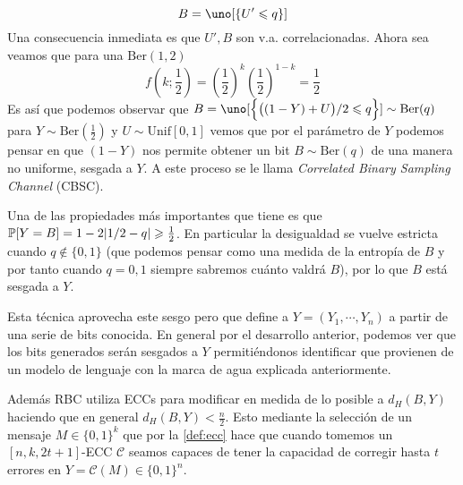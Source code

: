 \documentclass[a4paper,11pt]{article}
\begin{document}
\[B=\uno[\{U'\leqslant q\}]\]
Una consecuencia inmediata es que $U',B$ son v.a. correlacionadas. Ahora sea veamos que para una $\textrm{Ber}(1,2)$
\[f(k;\frac{1}{2})=\left(\frac{1}{2}\right)^k\left(\frac{1}{2}\right)^{1-k}=\frac{1}{2}\]
Es así que podemos observar que $B=\uno[\Big\{\big((1-Y)+U\big)/2\leqslant q\Big\}]\sim \textrm{Ber}(q)$ para $Y\sim\textrm{Ber}\left(\frac{1}{2}\right)$ y $U\sim\textrm{Unif}[0,1]$ vemos que por el parámetro de $Y$ podemos pensar en que $(1-Y)$ nos permite obtener un bit $B\sim\textrm{Ber}(q)$ de una manera no uniforme, sesgada a $Y$. A este proceso se le llama \textit{Correlated Binary Sampling Channel} (CBSC).
\par Una de las propiedades más importantes que tiene es que $\mathbb{P}[Y=B]=1-2|1/2-q|\geqslant\frac{1}{2}$. En particular la desigualdad se vuelve estricta cuando $q\not\in\{0,1\}$ (que podemos pensar como una medida de la entropía de $B$ y por tanto cuando $q=0,1$ siempre sabremos cuánto valdrá $B$), por lo que $B$ está sesgada a $Y$. 
\par Esta técnica aprovecha este sesgo pero que define a $Y=(Y_1,\cdots,Y_n)$ a partir de una serie de bits conocida. En general por el desarrollo anterior, podemos ver que los bits generados serán sesgados a $Y$ permitiéndonos identificar que provienen de un modelo de lenguaje con la marca de agua explicada anteriormente. 
\par Además RBC utiliza ECCs para modificar en medida de lo posible a $d_H(B,Y)$ haciendo que en general $d_H(B,Y)<\frac{n}{2}$. Esto mediante la selección de un mensaje $M\in\{0,1\}^k$ que por la \cref{def:ecc} hace que cuando tomemos un $[n,k,2t+1]$-ECC $\mathcal C$ seamos capaces de tener la capacidad de corregir hasta $t$ errores en $Y=\mathcal C(M)\in\{0,1\}^n$.
\end{document}
